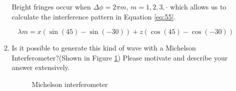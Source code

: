 \documentclass[main.tex]{subfiles}
\begin{document}
\begin{enumerate}
\begin{enumerate}
Bright fringes occur when $\Delta \phi = 2\pi m$, $m=1,2,3,\cdot$ which allows us to calculate the interference pattern in Equation \ref{eq:55}.

\begin{equation}\label{eq:55}
\lambda m =  x(\sin(45)-\sin(-30)) + z(\cos(45)-\cos(-30))
\end{equation}

\item{Is it possible to generate this kind of wave with a Michelson Interferometer?(Shown in Figure \ref{fig:53}) Please motivate and describe your answer extensively.}

\begin{figure}
\centering{}
\caption{Michelson interferometer}
\label{fig:53}
\end{figure}



\end{enumerate}
\end{enumerate}
\end{document}
